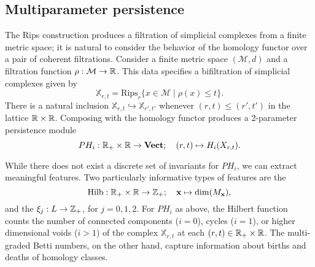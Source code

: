\documentclass{article}
\begin{document}

\subsection{Multiparameter persistence}
The Rips construction produces a filtration of simplicial complexes from a
finite metric space; it is natural to consider the behavior of the homology
functor over a pair of coherent filtrations. Consider
a finite metric space $(\mathcal M, d)$ and a filtration
function $\rho:\mathcal M \to \mathbb{R}$. This data specifies a bifiltration of
simplicial complexes given by
\[\mathbb{X}_{r,t} = \text{Rips}_r\{x \in \mathcal M \mid \rho(x) \leq t\}.\]
There is a natural inclusion $\mathbb{X}_{r,t} \hookrightarrow
\mathbb{X}_{r',t'}$ whenever $(r,t) \leq (r',t')$ in the lattice $\mathbb{R} \times \mathbb{R}$.
Composing with the homology functor produces a 2-parameter persistence module
\[PH_{i}: \mathbb{R}_+ \times \mathbb{R} \to \operatorname{\mathbf{Vect}}; \quad (r,t) \mapsto H_i(X_{r,t}).\]



While there does not exist a discrete set of invariants for  $PH_i$, we can extract
meaningful features. Two particularly informative types of features are 
 the 
  \[\text{Hilb}: \mathbb{R}_+ \times \mathbb{R} \to \mathbb{Z}_+;\quad \mathbf{x} \mapsto \dim(M_\mathbf{x}),\] and
the  $\xi_j: L \to \mathbb{Z}_+$, for $j =
0,1,2$. For $PH_i$ as above, the Hilbert function counts the number of
connected components ($i=0$), cycles ($i=1$), or higher dimensional voids ($i >
1$) of the complex $\mathbb{X}_{r,t}$ at each $(r,t) \in \mathbb{R}_+\times \mathbb{R}$. The multi-graded
Betti numbers, on the other hand, capture information about births
and deaths of homology classes.
\end{document}
